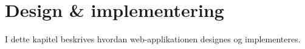\chapter{Design \& implementering}
I dette kapitel beskrives hvordan web-applikationen designes og implementeres. 









